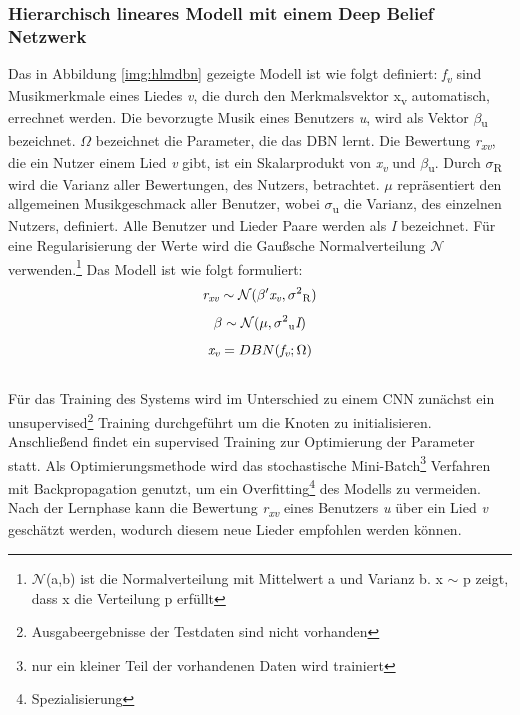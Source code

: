 \documentclass[twosided,a4,10pt]{article}
\begin{document}
\begin{multicols}{2}
		\subsubsection{Hierarchisch lineares Modell mit einem Deep Belief Netzwerk}
		Das in Abbildung \ref{img:hlmdbn} gezeigte Modell ist wie folgt definiert: \textit{f\textsubscript{v}} sind Musikmerkmale eines Liedes \textit{v}, die durch den Merkmalsvektor x\textsubscript{v} automatisch, errechnet werden. Die bevorzugte Musik eines Benutzers \textit{u}, wird als Vektor $\beta$\textsubscript{u} bezeichnet. $\Omega$ bezeichnet die Parameter, die das DBN lernt. Die Bewertung \textit{r\textsubscript{xv}}, die ein Nutzer einem Lied \textit{v} gibt, ist ein Skalarprodukt von \textit{x\textsubscript{v}} und $\beta$\textsubscript{u}. Durch $\sigma$\textsubscript{R} wird die Varianz aller Bewertungen, des Nutzers, betrachtet. $\mu$ repräsentiert den allgemeinen Musikgeschmack aller Benutzer, wobei $\sigma$\textsubscript{u} die Varianz, des einzelnen Nutzers, definiert. Alle Benutzer und Lieder Paare werden als \textit{I} bezeichnet. Für eine Regularisierung der Werte wird die Gaußsche Normalverteilung $\mathcal{N}$ verwenden.\footnote[16]{$\mathcal{N}$(a,b) ist die Normalverteilung mit Mittelwert a und Varianz b. x $\sim$ p zeigt, dass x die Verteilung p erfüllt}\newline
		Das Modell ist wie folgt formuliert:\newline
		\begin{equation*}
			\centering
			\textit{r\textsubscript{xv}}\sim\mathcal{N}(\beta'\textit{x\textsubscript{v}},\sigma\textsuperscript{2}\textsubscript{R})
		\end{equation*}
		\begin{equation*}
		\centering
			\beta\sim\mathcal{N}(\mu,\sigma\textsuperscript{2}\textsubscript{u}\textit{I})
		\end{equation*}
		\begin{equation*}
			\textit{x\textsubscript{v}} = DBN(\textit{f\textsubscript{v}};\Omega)
		\end{equation*}\newline\\
		Für das Training des Systems wird im Unterschied zu einem CNN zunächst ein unsupervised\footnote[17]{Ausgabeergebnisse der Testdaten sind nicht vorhanden} Training durchgeführt um die Knoten zu initialisieren. Anschließend findet ein supervised Training zur Optimierung der Parameter statt. Als Optimierungsmethode wird das stochastische Mini-Batch\footnote[18]{nur ein kleiner Teil der vorhandenen Daten wird trainiert} Verfahren mit Backpropagation genutzt, um ein Overfitting\footnote[19]{Spezialisierung} des Modells zu vermeiden. Nach der Lernphase kann die Bewertung \textit{r\textsubscript{xv}} eines Benutzers \textit{u} über ein Lied \textit{v} geschätzt werden, wodurch diesem neue Lieder empfohlen werden können. \cite{wang}

\end{multicols}
\end{document}
